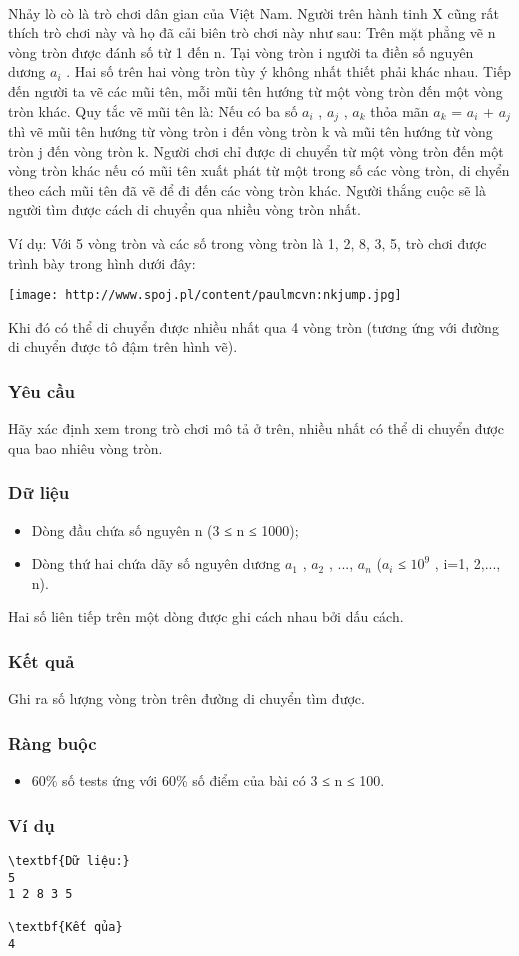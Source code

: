 

 

Nhảy lò cò là trò chơi dân gian của Việt Nam. Người trên hành tinh X cũng rất thích trò chơi này và họ đã cải biên trò chơi này như sau: Trên mặt phẳng vẽ n vòng tròn được đánh số từ 1 đến n. Tại vòng tròn i người ta điền số nguyên dương $a_{i}$ . Hai số trên hai vòng tròn tùy ý không nhất thiết phải khác nhau. Tiếp đến người ta vẽ các mũi tên, mỗi mũi tên hướng từ một vòng tròn đến một vòng tròn khác. Quy tắc vẽ mũi tên là: Nếu có ba số $a_{i}$ , $a_{j}$ , $a_{k}$ thỏa mãn $a_{k}$ = $a_{i}$ + $a_{j}$ thì vẽ mũi tên hướng từ vòng tròn i đến vòng tròn k và mũi tên hướng từ vòng tròn j đến vòng tròn k. Người chơi chỉ được di chuyển từ một vòng tròn đến một vòng tròn khác nếu có mũi tên xuất phát từ một trong số các vòng tròn, di chyển theo cách mũi tên đã vẽ để đi đến các vòng tròn khác. Người thắng cuộc sẽ là người tìm được cách di chuyển qua nhiều vòng tròn nhất.

Ví dụ: Với 5 vòng tròn và các số trong vòng tròn là 1, 2, 8, 3, 5, trò chơi được trình bày trong hình dưới đây:


\texttt{[image: http://www.spoj.pl/content/paulmcvn:nkjump.jpg]}

Khi đó có thể di chuyển được nhiều nhất qua 4 vòng tròn (tương ứng với đường di chuyển được tô đậm trên hình vẽ).

\subsubsection{Yêu cầu}

Hãy xác định xem trong trò chơi mô tả ở trên, nhiều nhất có thể di chuyển được qua bao nhiêu vòng tròn.

\subsubsection{Dữ liệu}
\begin{itemize}
	\item Dòng đầu chứa số nguyên n (3 ≤ n ≤ 1000);
	\item Dòng thứ hai chứa dãy số nguyên dương $a_{1}$ , $a_{2}$ , ..., $a_{n}$ ($a_{i}$ ≤ $10^{9}$ , i=1, 2,..., n).
\end{itemize}

Hai số liên tiếp trên một dòng được ghi cách nhau bởi dấu cách.

\subsubsection{Kết quả}

Ghi ra số lượng vòng tròn trên đường di chuyển tìm được.

\subsubsection{Ràng buộc}
\begin{itemize}
	\item 60\% số tests ứng với 60\% số điểm của bài có 3 ≤ n ≤ 100.
\end{itemize}

\subsubsection{Ví dụ}
\begin{verbatim}
\textbf{Dữ liệu:}
5
1 2 8 3 5

\textbf{Kết qủa}
4
\end{verbatim}
